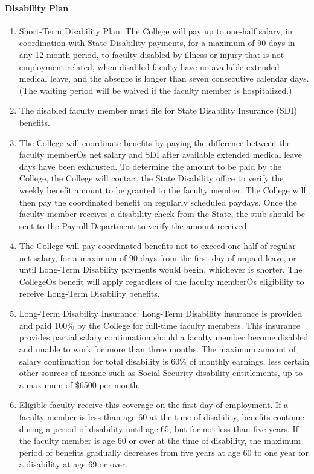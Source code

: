 \documentclass[letterpaper, 11pt]{article}
\begin{document}
			\paragraph{Disability Plan}
				\begin{enumerate}[label=\alph*)]
					\item{Short-Term Disability Plan:  The College will pay up to one-half salary, in coordination with State Disability payments, for a maximum of 90 days in any 12-month period, to faculty disabled by illness or injury that is not employment related, when disabled faculty have no available extended medical leave, and the absence is longer than seven consecutive calendar days.  (The waiting period will be waived if the faculty member is hospitalized.)}
					\item{The disabled faculty member must file for State Disability Insurance (SDI) benefits.}
					\item{The College will coordinate benefits by paying the difference between the faculty memberÕs net salary and SDI after available extended medical leave days have been exhausted.  To determine the amount to be paid by the College, the College will contact the State Disability office to verify the weekly benefit amount to be granted to the faculty member.  The College will then pay the coordinated benefit on regularly scheduled paydays.  Once the faculty member receives a disability check from the State, the stub should be sent to the Payroll Department to verify the amount received.}
					\item{The College will pay coordinated benefits not to exceed one-half of regular net salary, for a maximum of 90 days from the first day of unpaid leave, or until Long-Term Disability payments would begin, whichever is shorter.  The CollegeÕs benefit will apply regardless of the faculty memberÕs eligibility to receive Long-Term Disability benefits.}
					\item{Long-Term Disability Insurance:  Long-Term Disability insurance is provided
						and paid 100\% by the College for full-time faculty members.  This insurance
						provides partial salary continuation should a faculty member become disabled and
						unable to work for more than three months.  The maximum amount of salary
						continuation for total disability is 60\% of monthly earnings, less certain other
						sources of income such as Social Security disability entitlements, up to a
						maximum of \$6500 per month.}
					\item{Eligible faculty receive this coverage on the first day of employment.  If a faculty member is less than age 60 at the time of disability, benefits continue during a period of disability until age 65, but for not less than five years.  If the faculty member is age 60 or over at the time of disability, the maximum period of benefits gradually decreases from five years at age 60 to one year for a disability at age 69 or over.}

\end{enumerate}
\end{document}
